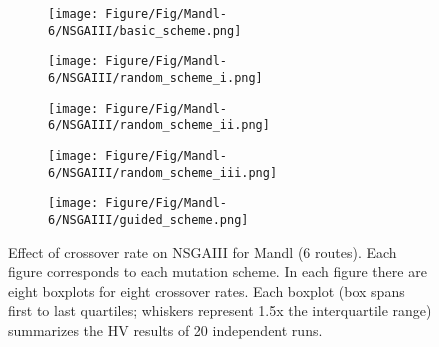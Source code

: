 \begin{figure}[!htbp]
	\centering
	\begin{subfigure}[b]{0.52\textwidth}
		\texttt{[image: Figure/Fig/Mandl-6/NSGAIII/basic\_scheme.png]}
	\end{subfigure}%
	\begin{subfigure}[b]{0.52\textwidth}
		\texttt{[image: Figure/Fig/Mandl-6/NSGAIII/random\_scheme\_i.png]}
	\end{subfigure}%
	\newline
	\begin{subfigure}[b]{0.52\textwidth}
		\texttt{[image: Figure/Fig/Mandl-6/NSGAIII/random\_scheme\_ii.png]}
	\end{subfigure}%
	\begin{subfigure}[b]{0.52\textwidth}
		\texttt{[image: Figure/Fig/Mandl-6/NSGAIII/random\_scheme\_iii.png]}
	\end{subfigure}%
	\newline
	\begin{subfigure}[b]{0.52\textwidth}
		\texttt{[image: Figure/Fig/Mandl-6/NSGAIII/guided\_scheme.png]}
	\end{subfigure}%
	\caption{Effect of crossover rate on NSGAIII for Mandl (6 routes). Each figure corresponds to each mutation scheme. In each figure there are eight boxplots for eight crossover rates.  Each boxplot (box spans first to last quartiles; whiskers represent 1.5x the interquartile range) summarizes the HV results of 20 independent runs.}
	\label{fig:cr_mandl6_nsgaiii}
\end{figure}
